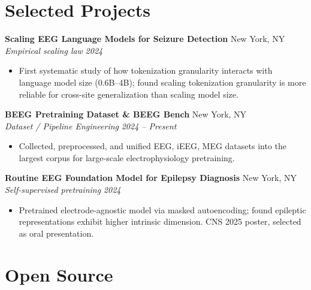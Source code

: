 \documentclass[11pt,a4paper]{article}
\newcommand{\cventry}[4]{%
  \noindent\textbf{#1} \hfill #2 \\
  \textit{#3} \hfill \textit{#4}
}
\begin{document}
\section{Selected Projects}

\vspace{4pt}

\cventry{Scaling EEG Language Models for Seizure Detection}{New York, NY}{Empirical scaling law}{2024}
\begin{itemize}[leftmargin=*, itemsep=1pt, topsep=2pt]
  \item First systematic study of how tokenization granularity interacts with language model size (0.6B--4B); found scaling tokenization granularity is more reliable for cross-site generalization than scaling model size.
\end{itemize}

\vspace{4pt}

\cventry{BEEG Pretraining Dataset \& BEEG Bench}{New York, NY}{Dataset / Pipeline Engineering}{2024 -- Present}
\begin{itemize}[leftmargin=*, itemsep=1pt, topsep=2pt]
  \item Collected, preprocessed, and unified EEG, iEEG, MEG datasets into the largest corpus for large-scale electrophysiology pretraining.
\end{itemize}

\vspace{4pt}

\cventry{Routine EEG Foundation Model for Epilepsy Diagnosis}{New York, NY}{Self-supervised pretraining}{2024}
\begin{itemize}[leftmargin=*, itemsep=1pt, topsep=2pt]
  \item Pretrained electrode-agnostic model via masked autoencoding; found epileptic representations exhibit higher intrinsic dimension. CNS 2025 poster, selected as oral presentation.
\end{itemize}

\section{Open Source}
\end{document}
